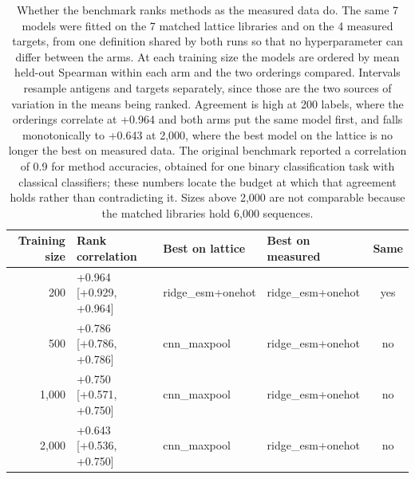 \documentclass[11pt,a4paper]{article}
\begin{document}
\begin{table}[h]
\caption{Whether the benchmark ranks methods as the measured data do. The same 7 models were fitted on the 7 matched lattice libraries and on the 4 measured targets, from one definition shared by both runs so that no hyperparameter can differ between the arms. At each training size the models are ordered by mean held-out Spearman within each arm and the two orderings compared. Intervals resample antigens and targets separately, since those are the two sources of variation in the means being ranked. Agreement is high at 200 labels, where the orderings correlate at +0.964 and both arms put the same model first, and falls monotonically to +0.643 at 2,000, where the best model on the lattice is no longer the best on measured data. The original benchmark reported a correlation of 0.9 for method accuracies, obtained for one binary classification task with classical classifiers; these numbers locate the budget at which that agreement holds rather than contradicting it. Sizes above 2,000 are not comparable because the matched libraries hold 6{,}000 sequences.}
\centering
\begin{tabular}{@{}rlllc@{}}
\toprule
Training size & Rank correlation & Best on lattice & Best on measured & Same \\
\midrule
200 & +0.964 [+0.929, +0.964] & ridge\_esm+onehot & ridge\_esm+onehot & yes \\
500 & +0.786 [+0.786, +0.786] & cnn\_maxpool & ridge\_esm+onehot & no \\
1,000 & +0.750 [+0.571, +0.750] & cnn\_maxpool & ridge\_esm+onehot & no \\
2,000 & +0.643 [+0.536, +0.750] & cnn\_maxpool & ridge\_esm+onehot & no \\
\bottomrule
\end{tabular}
\end{table}
\end{document}

